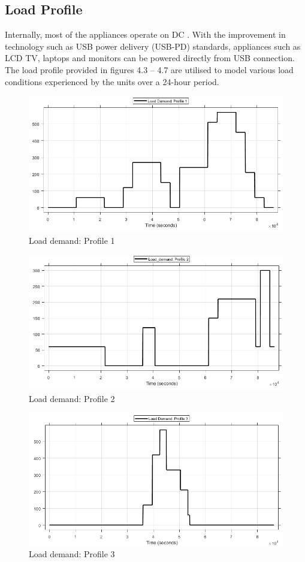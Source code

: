 \subsection{Load Profile}
Internally, most of the appliances operate on DC \cite{42}. With the improvement in technology such as USB power delivery (USB-PD) standards, appliances such as LCD TV, laptops and monitors can be powered directly from USB connection.  The load profile provided in figures 4.3 – 4.7 are utilised to model various load conditions experienced by the units over a 24-hour period.
\begin{figure}[H]
	\centering
	\includegraphics[totalheight=8cm]{Figures/ldp1.png}
	\caption{Load demand: Profile 1}
\end{figure}
\begin{figure}[H]
	\centering
	\includegraphics[totalheight=8cm]{Figures/ldp2.png}
	\caption{Load demand: Profile 2}
\end{figure}
\begin{figure}[H]
	\centering
	\includegraphics[totalheight=8cm]{Figures/ldp3.png}
	\caption{Load demand: Profile 3}
\end{figure}
